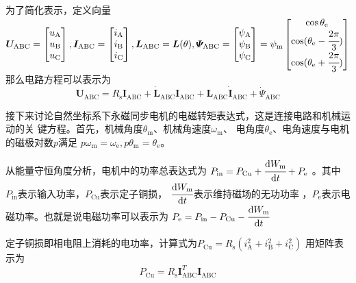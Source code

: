 为了简化表示，定义向量
\(
\bm{U}_{\mathrm{ABC}}=
\begin{bmatrix}
    u_{\mathrm{A}}\\u_{\mathrm{B}}\\u_{\mathrm{C}}
\end{bmatrix},
\bm{I}_{\mathrm{ABC}}=
\begin{bmatrix}
    i_{\mathrm{A}}\\i_{\mathrm{B}}\\i_{\mathrm{C}}
\end{bmatrix},
\bm{L}_{\mathrm{ABC}}=
\bm{L}(\theta),
\bm{\varPsi}_{\mathrm{ABC}}=
\begin{bmatrix}
    \psi_{\mathrm{A}}\\\psi_{\mathrm{B}}\\\psi_{\mathrm{C}}
\end{bmatrix}
=\psi_{\mathrm{m}}
\begin{bmatrix}\cos\theta_{\mathrm{e}}\\
    \cos(\theta_{\mathrm{e}}-\cfrac{2\pi}{3})\\
    \cos(\theta_{\mathrm{e}}+\cfrac{2\pi}{3})
\end{bmatrix}
\)
那么电路方程可以表示为
\begin{equation}
    \bm{U}_{\mathrm{ABC}}=
    R_{\mathrm{s}}\bm{I}_{\mathrm{ABC}}+
    {\dot{\bm{L}}_{\mathrm{ABC}}\bm{I}_{\mathrm{ABC}}+
    \bm{L}_{\mathrm{ABC}}\dot{\bm{I}}_{\mathrm{ABC}}}
    +{\dot{\bm{\varPsi}}_{\mathrm{ABC}}}
    \label{eq:自然坐标系电路方程}
\end{equation}

接下来讨论自然坐标系下永磁同步电机的电磁转矩表达式，这是连接电路和机械运动的关
键方程。首先，机械角度\(\theta_{\mathrm{m}}\)、机械角速度\(\omega_{\mathrm{m}}\)、
电角度\(\theta_{\mathrm{e}}\)、电角速度与电机的磁极对数\(p\)满足    
\(p\omega_{\mathrm{m}}=\omega_{\mathrm{e}},p\theta_{\mathrm{m}}=\theta_{\mathrm{e}}\)。

从能量守恒角度分析，电机中的功率总表达式为
\(P_{\mathrm{in}}=P_{\mathrm{Cu}}+\cfrac{\mathrm{d} W_{\mathrm{m}}}{\mathrm{d} t}+P_{\mathrm{e}}\)
。其中\(P_{\mathrm{in}}\)表示输入功率，\(P_{\mathrm{Cu}}\)表示定子铜损，
\(\cfrac{\mathrm{d} W_{\mathrm{m}}}{\mathrm{d} t}\)表示维持磁场的无功功率
，\(P_{\mathrm{e}}\)表示电磁功率。也就是说电磁功率可以表示为
\(P_{\mathrm{e}}=P_{\mathrm{in}}-P_{\mathrm{Cu}}-\cfrac{\mathrm{d} W_{\mathrm{m}}}{\mathrm{d} t}\)

定子铜损即相电阻上消耗的电功率，计算式为\(P_{\mathrm{Cu}}=R_{\mathrm{s}}(i_{\mathrm{A}}^2+i_{\mathrm{B}}^2+i_{\mathrm{C}}^2)\)
用矩阵表示为
\begin{equation*}
    P_{\mathrm{Cu}}=R_{\mathrm{s}}\bm{I}^T_{\mathrm{ABC}}\bm{I}_{\mathrm{ABC}}
\end{equation*}

